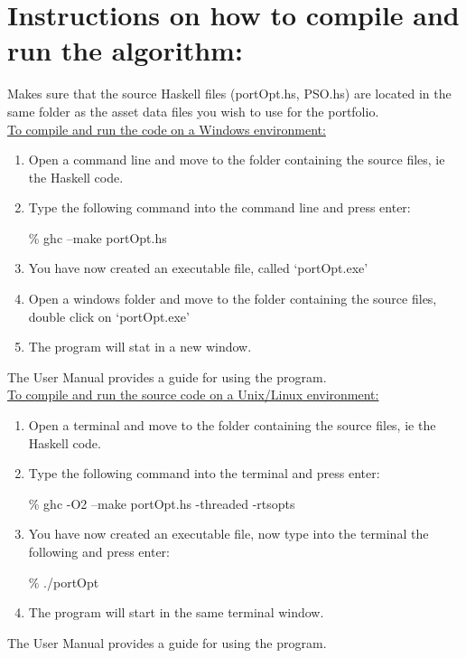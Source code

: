 \documentclass[]{report}
\begin{document}
\section*{Instructions on how to compile and run the algorithm:} 
  Makes sure that the source Haskell files (portOpt.hs, PSO.hs) are located in the same folder as the asset data files you wish to use for the portfolio.
  \\\underline{To compile and run the code on a Windows environment:}
  \begin{enumerate}
    \item Open a command line and move to the folder containing the source files, ie the Haskell code.
    \item Type the following command into the command line and press enter:
  \begin{center} \% ghc --make portOpt.hs \end{center}
    \item You have now created an executable file, called `portOpt.exe'
    \item Open a windows folder and move to the folder containing the source files, double click on `portOpt.exe'
    \item The program will stat in a new window.
  \end{enumerate}
  The User Manual provides a guide for using the program.
  \\\underline{To compile and run the source code on a Unix/Linux environment:}
  \begin{enumerate}
    \item Open a terminal and move to the folder containing the source files, ie the Haskell code.
    \item Type the following command into the terminal and press enter:
  \begin{center} \% ghc -O2 --make portOpt.hs -threaded -rtsopts \end{center}
    \item You have now created an executable file, now type into the terminal the following and press enter:
  \begin{center} \% ./portOpt \end{center}
    \item The program will start in the same terminal window.
  \end{enumerate}
  The User Manual provides a guide for using the program.
\end{document}
